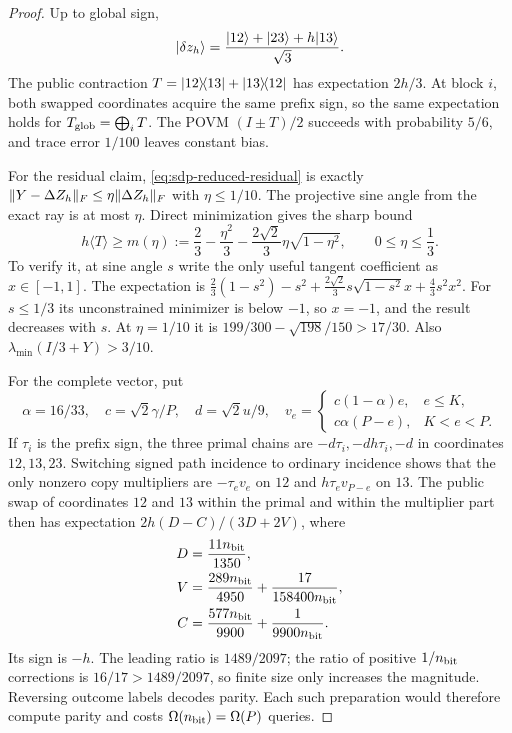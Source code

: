 \begin{proof}
Up to global sign,
\begin{equation}
 \lvert \delta z_h\rangle=\frac{\lvert 12\rangle+\lvert 23\rangle+h\lvert 13\rangle}{\sqrt3}.
\end{equation}
The public contraction $T=\lvert 12\rangle\!\langle 13\rvert+\lvert 13\rangle\!\langle 12\rvert$ has
expectation $2h/3$.  At block $i$, both swapped coordinates acquire the same
prefix sign, so the same expectation holds for
$T_{\rm glob}=\bigoplus_iT$.  The POVM $(I\pm T)/2$ succeeds with probability
$5/6$, and trace error $1/100$ leaves constant bias.

For the residual claim, \eqref{eq:sdp-reduced-residual} is exactly
$\lVert Y-\Delta Z_h\rVert_F\leq\eta\lVert\Delta Z_h\rVert_F$ with
$\eta\leq1/10$.  The projective sine angle from the exact ray is at most
$\eta$.  Direct minimization gives the sharp bound
\begin{equation}
 h\langle T\rangle\geq m(\eta):=\frac23-\frac{\eta^2}{3}
 -\frac{2\sqrt2}{3}\eta\sqrt{1-\eta^2},\qquad0\leq\eta\leq\frac13.
 \label{eq:sdp-sharp-decoder}
\end{equation}
To verify it, at sine angle $s$ write the only useful tangent coefficient as
$x\in[-1,1]$.  The expectation is
$\frac23(1-s^2)-s^2+\frac{2\sqrt2}{3}s\sqrt{1-s^2}x+
\frac43s^2x^2$.  For $s\leq1/3$ its unconstrained minimizer is below $-1$,
so $x=-1$, and the result decreases with $s$.  At $\eta=1/10$ it is
$199/300-\sqrt{198}/150>17/30$.  Also
$\lambda_{\min}(I/3+Y)>3/10$.

For the complete vector, put
\begin{equation}
 \alpha=16/33,\quad c=\sqrt2\gamma/P,\quad d=\sqrt2u/9,
 \quad v_e=\begin{cases}c(1-\alpha)e,&e\leq K,\\
                          c\alpha(P-e),&K<e<P.
             \end{cases}                                  \label{eq:sdp-tent}
\end{equation}
If $\tau_i$ is the prefix sign, the three primal chains are
$-d\tau_i,-dh\tau_i,-d$ in coordinates $12,13,23$.  Switching signed path
incidence to ordinary incidence shows that the only nonzero copy multipliers
are $-\tau_ev_e$ on $12$ and $h\tau_ev_{P-e}$ on $13$.  The public
swap of coordinates $12$ and $13$ within the primal and within the multiplier
part then has expectation $2h(D-C)/(3D+2V)$, where
\begin{align}
 D&=\frac{11n_{\rm bit}}{1350},\nonumber\\
 V&=\frac{289n_{\rm bit}}{4950}+\frac{17}{158400n_{\rm bit}},\nonumber\\
 C&=\frac{577n_{\rm bit}}{9900}+\frac1{9900n_{\rm bit}}.  \label{eq:sdp-kkt-sums}
\end{align}
Its sign is $-h$.  The leading ratio is $1489/2097$; the ratio of positive
$1/n_{\rm bit}$ corrections is $16/17>1489/2097$, so finite size only
increases the magnitude.  Reversing outcome labels decodes parity.  Each
such preparation would therefore compute parity and costs
$\Omega(n_{\rm bit})=\Omega(P)$ queries.
\end{proof}

